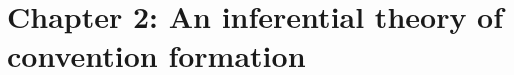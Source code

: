 \documentclass[11pt]{article}
\begin{document}




\section*{Chapter 2: An inferential theory of convention formation}
\end{document}

